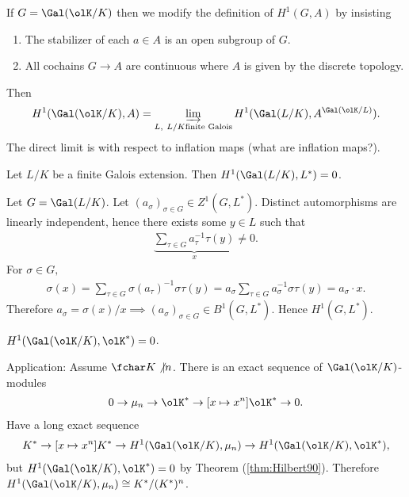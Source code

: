 If $G = \Gal(\olK/K)$ then we modify the definition of $H^1(G,A)$ by insisting
\begin{enumerate}
	\item The stabilizer of each $a \in A$ is an open subgroup of $G$.
	\item All cochains $G \to A$ are continuous where $A$ is given by the discrete topology.
\end{enumerate}
Then
\begin{align*}
	H^1(\Gal(\olK/K),A) = \varinjlim_{L, ~L/K \text{finite Galois}} H^1(\Gal(L/K), A^{\Gal(\olK/L)}).
\end{align*}
The direct limit is with respect to inflation maps (what are inflation maps?).

\begin{thm}\label{thm:Hilbert90}
	Let $L/K$ be a finite Galois extension. Then $H^1(\Gal(L/K),L^*) = 0$.
\end{thm}
\begin{prf}
	Let $G = \Gal(L/K)$. Let $(a_\sigma)_{\sigma \in G} \in Z^1(G,L^*)$. Distinct automorphisms are linearly independent, hence there exists some $y \in L$ such that
	\begin{align*}
		\underbrace{\sum_{\tau \in G} a_\tau^{-1} \tau(y)}_x \neq 0.
	\end{align*}
	For $\sigma \in G,$
	\begin{align*}
		\sigma(x) = \sum_{\tau \in G} \sigma(a_\tau)^{-1} \sigma \tau(y) = a_\sigma \sum_{\tau \in G} a_\sigma^{-1} \sigma \tau (y) = a_\sigma \cdot x.
	\end{align*}
	Therefore $a_\sigma = \sigma(x)/x \implies (a_\sigma)_{\sigma \in G} \in B^1(G,L^*)$. Hence $H^1(G,L^*)$.
\end{prf}

\begin{cor}\label{cor:vanishing-first-cohomology}
	$H^1(\Gal(\olK/K),\olK^*) = 0$.
\end{cor}
Application: Assume $\fchar K \not | n$. There is an exact sequence of $\Gal(\olK/K)$-modules
\begin{align*}
	0 \to \mu_n \to \olK^* \to[x\mapsto x^n] \olK^* \to 0.
\end{align*}
Have a long exact sequence
\begin{align*}
	K^* \to[x \mapsto x^n] K^* \to H^1(\Gal(\olK/K),\mu_n) \to H^1(\Gal(\olK/K),\olK^*),
\end{align*}
but $H^1(\Gal(\olK/K),\olK^*) = 0$ by Theorem (\ref{thm:Hilbert90}). Therefore $H^1(\Gal(\olK/K),\mu_n) \cong K^*/(K^*)^n$. 

